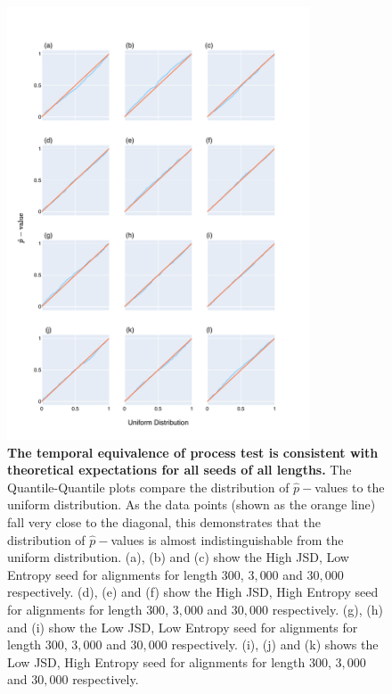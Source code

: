 \begin{figure}[!ht]
\centering
\includegraphics[width=0.8\textwidth]{figures/plots/synthetic/temp_eop/all_seeds.pdf}
\caption{\textbf{The temporal equivalence of process test is consistent with theoretical expectations for all seeds of all lengths.} The Quantile-Quantile plots compare the distribution of $\hat p-$values to the uniform distribution. As the data points (shown as the orange line) fall very close to the diagonal, this demonstrates that the distribution of $\hat p-$values is almost indistinguishable from the uniform distribution. (a), (b) and (c) show the High JSD, Low Entropy seed for alignments for length $300$, $3,000$ and $30,000$ respectively. (d), (e) and (f) show the High JSD, High Entropy seed for alignments for length $300$, $3,000$ and $30,000$ respectively. (g), (h) and (i) show the Low JSD, Low Entropy seed for alignments for length $300$, $3,000$ and $30,000$ respectively. (i), (j) and (k) shows the Low JSD, High Entropy seed for alignments for length $300$, $3,000$ and $30,000$ respectively.}
\label{fig:synthetic/temp_eop/all_seeds}
\end{figure}